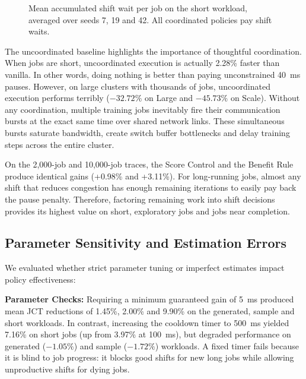 \documentclass[conference]{IEEEtran}
\begin{document}
\begin{figure}[t]
\centering
{}
\caption{Mean accumulated shift wait per job on the short workload, averaged over seeds 7, 19 and 42. All coordinated policies pay shift waits.}
\label{fig:short-waits}
\end{figure}

The uncoordinated baseline highlights the importance of thoughtful coordination. When jobs are short, uncoordinated execution is actually 2.28\% faster than vanilla. In other words, doing nothing is better than paying unconstrained 40~ms pauses. However, on large clusters with thousands of jobs, uncoordinated execution performs terribly ($-32.72\%$ on Large and $-45.73\%$ on Scale). Without any coordination, multiple training jobs inevitably fire their communication bursts at the exact same time over shared network links. These simultaneous bursts saturate bandwidth, create switch buffer bottlenecks and delay training steps across the entire cluster.

On the 2,000-job and 10,000-job traces, the Score Control and the Benefit Rule produce identical gains (+0.98\% and +3.11\%). For long-running jobs, almost any shift that reduces congestion has enough remaining iterations to easily pay back the pause penalty. Therefore, factoring remaining work into shift decisions provides its highest value on short, exploratory jobs and jobs near completion.

\subsection{Parameter Sensitivity and Estimation Errors}

We evaluated whether strict parameter tuning or imperfect estimates impact policy effectiveness:

\textbf{Parameter Checks:} Requiring a minimum guaranteed gain of 5~ms produced mean JCT reductions of 1.45\%, 2.00\% and 9.90\% on the generated, sample and short workloads. In contrast, increasing the cooldown timer to 500~ms yielded 7.16\% on short jobs (up from 3.97\% at 100~ms), but degraded performance on generated ($-1.05\%$) and sample ($-1.72\%$) workloads. A fixed timer fails because it is blind to job progress: it blocks good shifts for new long jobs while allowing unproductive shifts for dying jobs.
\end{document}

